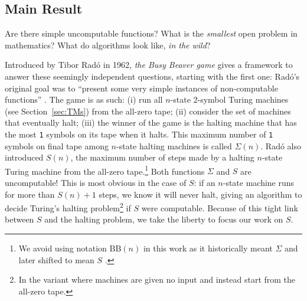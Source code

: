\documentclass[a4paper,british]{article}
\theoremstyle{definition} %
\numberwithin{equation}{section}
\theoremstyle{definition} %
\newcommand{\sone}{\texttt{1}\xspace}
\newcommand{\radofull}{Tibor Rad\'o\xspace}
\newcommand{\rado}{Rad\'o\xspace}
\begin{document}
\subsection{Main Result}\label{sec:intro:mainresults}

\newcommand{\noncomput}{uncomputable\xspace}
\newcommand{\BBfull}{Busy Beaver\xspace}
\newcommand{\Coq}{Coq\xspace}
\newcommand{\CoqProofReleaseURL}{\url{https://github.com/ccz181078/Coq-BB5}}

\newcommand{\ie}{i.e.~}
\newcommand{\eg}{e.g.~}

Are there simple \noncomput functions? What is the \textit{smallest} open problem in mathematics? What do algorithms look like, \textit{in the wild}?

Introduced by \radofull in 1962, \textit{the \BBfull game} gives a framework to answer these seemingly independent questions, starting with the first one: \rado's original goal was to ``present some very simple instances of non-computable functions'' \cite{Rado_1962}. The game is as such: (i) run all $n$-state 2-symbol Turing machines (see Section~\ref{sec:TMs}) from the all-zero tape; (ii) consider the set of machines that eventually halt; (iii) the winner of the game is the halting machine that has the most \sone symbols on its tape when it halts. This maximum number of \sone symbols on final tape among $n$-state halting machines is called $\Sigma(n)$. \rado also introduced $S(n)$, the maximum number of steps made by a halting $n$-state Turing machine from the all-zero tape.\footnote{We avoid using notation $\text{BB}(n)$ in this work as it historically meant $\Sigma$ \cite{Rado_1962, 10.5555/1151785.1151794} and later shifted to mean $S$ \cite{BusyBeaverFrontier,sterin_2022_14955828}.} Both functions $\Sigma$ and $S$ are \noncomput! This is most obvious in the case of $S$: if an $n$-state machine runs for more than $S(n)+1$ steps, we know it will never halt, giving an algorithm to decide Turing's halting problem\footnote{In the variant where machines are given no input and instead start from the all-zero tape.} if $S$ were computable. Because of this tight link between $S$ and the halting problem, we take the liberty to focus our work on $S$.
\end{document}
